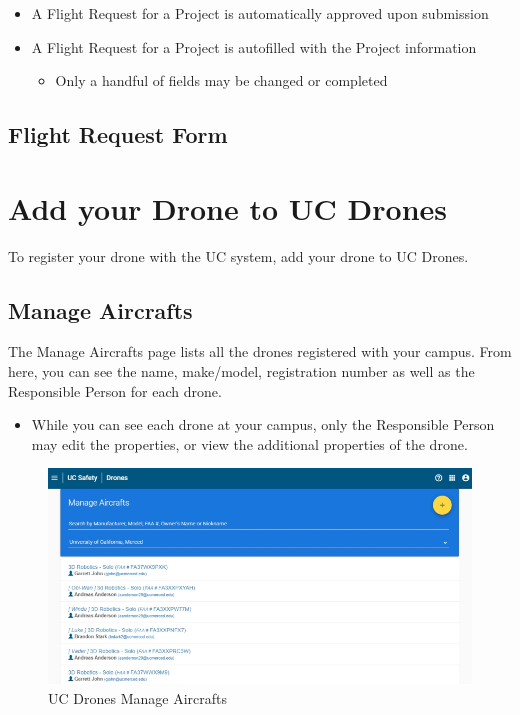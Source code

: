 \documentclass[
]{book}
\providecommand{\tightlist}{%
  \setlength{\itemsep}{0pt}\setlength{\parskip}{0pt}}
\begin{document}
\begin{itemize}
\tightlist
\item
  A Flight Request for a Project is automatically approved upon submission
\item
  A Flight Request for a Project is autofilled with the Project information

  \begin{itemize}
  \tightlist
  \item
    Only a handful of fields may be changed or completed
  \end{itemize}
\end{itemize}

\hypertarget{flight-request-form}{%
\section{Flight Request Form}\label{flight-request-form}}

\hypertarget{ch-add-drone}{%
\chapter{Add your Drone to UC Drones}\label{ch-add-drone}}

To register your drone with the UC system, add your drone to UC Drones.

\hypertarget{manag-aircraft}{%
\section{Manage Aircrafts}\label{manag-aircraft}}

The Manage Aircrafts page lists all the drones registered with your campus. From here, you can see the name, make/model, registration number as well as the Responsible Person for each drone.

\begin{itemize}
\tightlist
\item
  While you can see each drone at your campus, only the Responsible Person may edit the properties, or view the additional properties of the drone.
\end{itemize}

\begin{figure}

{\centering \includegraphics[width=0.95\linewidth]{images/UCDrones_manage_drones} 

}

\caption{UC Drones Manage Aircrafts}\label{fig:UCDrones-manage-aircrafts}
\end{figure}
\end{document}
